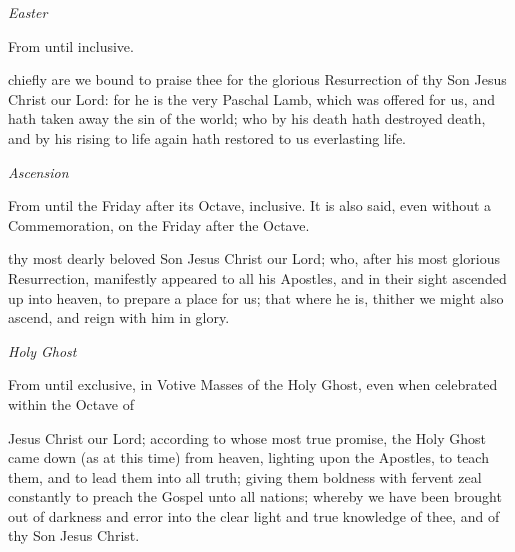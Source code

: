 \begin{multicols}{2}
\vspace{0.5\baselineskip}

\centerline{\textit{Easter}}
\begin{rubric}
	From  until  inclusive.
\end{rubric}
 chiefly are we bound to praise thee for the glorious Resurrection of thy Son Jesus Christ our Lord: for he is the very Paschal Lamb, which was offered for us, and hath taken away the sin of the world; who by his death hath destroyed death, and by his rising to life again hath restored to us everlasting life.

\vspace{0.5\baselineskip}

\centerline{\textit{Ascension}}
\begin{rubric}
	From  until the Friday after its Octave, inclusive. It is also said, even without a Commemoration, on the Friday after the Octave.
\end{rubric}
 thy most dearly beloved Son Jesus Christ our Lord; who, after his most glorious Resurrection, manifestly appeared to all his Apostles, and in their sight ascended up into heaven, to prepare a place for us; that where he is, thither we might also ascend, and reign with him in glory.\\

\centerline{\textit{Holy Ghost}}
\begin{rubric}
	From  until  exclusive, in Votive Masses of the Holy Ghost, even when celebrated within the Octave of 
\end{rubric}
 Jesus Christ our Lord; according to whose most true promise, the Holy Ghost came down (as at this time) from heaven, lighting upon the Apostles, to teach them, and to lead them into all truth; giving them boldness with fervent zeal constantly to preach the Gospel unto all nations; whereby we have been brought out of darkness and error into the clear light and true knowledge of thee, and of thy Son Jesus Christ.\\


\end{multicols}
